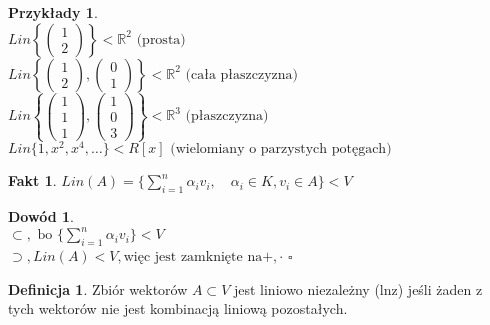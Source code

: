 \documentclass[12pt,a4paper]{article}
\newcommand{\RR}{\mathbb{R}}
\renewcommand{\qed}{$\square$}
\theoremstyle{plain}
\theoremstyle{definition}
\newtheorem{ft}{Fakt}[section]
\theoremstyle{definition}
\newtheorem{df}{Definicja}[section]
\theoremstyle{definition}
\theoremstyle{definition}
\newtheorem*{dd}{Dowód}
\theoremstyle{definition}
\theoremstyle{definition}
\newtheorem*{przy}{Przykłady}
\theoremstyle{definition}
\theoremstyle{definition}
\begin{document}
\begin{przy}
    ~\\ 
    $Lin\left\{
        \begin{pmatrix}
            1 \\ 
            2
        \end{pmatrix}
    \right\} < \RR^2 \text{ (prosta)}
    $ \\
    $Lin\left\{
        \begin{pmatrix}
            1 \\ 
            2
        \end{pmatrix}, 
        \begin{pmatrix}
            0 \\ 
            1
        \end{pmatrix}
        \right\} < \RR^2 \text{ (cała płaszczyzna)}
    $\\ 
    $
        Lin\left\{
        \begin{pmatrix}
            1 \\ 
            1 \\
            1
        \end{pmatrix}, 
        \begin{pmatrix}
            1 \\ 
            0 \\
            3
        \end{pmatrix}
        \right\} < \RR^3 \text{ (płaszczyzna)}
    $ \\
    $
        Lin\{1,x^2,x^4,\dots\} < R[x] \text{ (wielomiany o parzystych potęgach)}
    $
\end{przy}

\begin{ft}
    $Lin(A) = \{ \sum\limits_{i=1}^{n} \alpha_i v_i, \quad \alpha_i \in K, v_i \in A\} < V$
\end{ft}

\begin{dd}
    ~\\
    $\subset, \text{ bo } \{ \sum\limits_{i=1}^{n} \alpha_i v_i\} < V$ \\
    $\supset, Lin(A) < V, \text{więc jest zamknięte na} +,\cdot$
    \qed
\end{dd}

\begin{df}
    Zbiór wektorów $ A \subset V $ jest liniowo niezależny (lnz) jeśli żaden z tych wektorów nie jest kombinacją liniową pozostałych.
\end{df}
\end{document}
